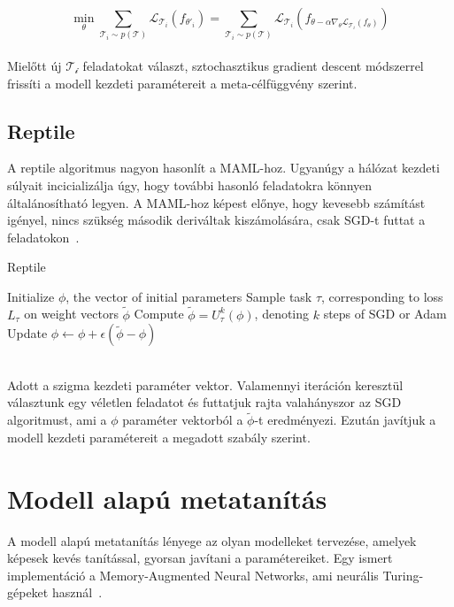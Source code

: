 \begin{equation} \label{eq:2}
\min_\theta \sum_{\mathcal{T}_i\sim p(\mathcal{T})}\mathcal{L}_{\mathcal{T}_i}(f_{\theta'_i})=
\sum_{\mathcal{T}_i\sim p(\mathcal{T})}\mathcal{L}_{\mathcal{T}_i}(f_{\theta-\alpha\nabla_{\theta}\mathcal{L}_{\mathcal{T}_i}(f_{\theta})})
\end{equation}
\ \\
Mielőtt új $\mathcal{T_i}$ feladatokat választ, sztochasztikus gradient descent módszerrel frissíti a modell kezdeti paramétereit a meta-célfüggvény szerint.
 
\subsection{Reptile}

A reptile algoritmus nagyon hasonlít a MAML-hoz. Ugyanúgy a hálózat kezdeti súlyait incicializálja úgy, hogy további hasonló feladatokra könnyen általánosítható legyen. A MAML-hoz képest előnye, hogy kevesebb számítást igényel, nincs szükség második deriváltak kiszámolására, csak SGD-t futtat a feladatokon~\cite{reptile}.

\begin{algorithm}
	\caption{Reptile}
	\label{fig:reptile-pseudo}
	\begin{algorithmic}[1]
		\State Initialize $\phi$, the vector of initial parameters
		\State Sample task $\tau$, corresponding to loss $L_{\tau}$ on weight vectors $\tilde\phi$
		\State Compute $\tilde\phi = U^k_{\tau}(\phi)$, denoting $k$ steps of SGD or Adam
		\State Update $\phi \gets \phi + \epsilon(\tilde\phi - \phi)$
		\EndFor
	\end{algorithmic}
\end{algorithm}
\ \\
Adott a szigma kezdeti paraméter vektor. Valamennyi iteráción keresztül választunk egy véletlen feladatot és futtatjuk rajta valahányszor az SGD algoritmust, ami a $\phi$ paraméter vektorból a $\tilde\phi$-t eredményezi. Ezután javítjuk a modell kezdeti paramétereit a megadott szabály szerint.

\section{Modell alapú metatanítás}

A modell alapú metatanítás lényege az olyan modelleket tervezése, amelyek képesek kevés tanítással, gyorsan javítani a paramétereiket. Egy ismert implementáció a Memory-Augmented Neural Networks, ami neurális Turing-gépeket használ~\cite{meta_learning_summarize}.
